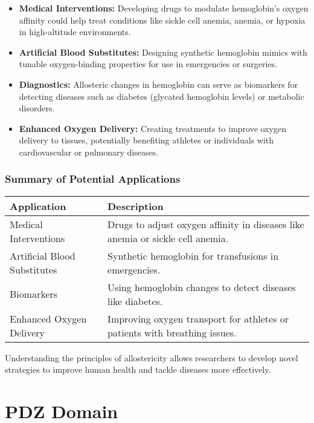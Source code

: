 \documentclass[English, Lau, oneside]{sapthesis}
\begin{document}
\begin{itemize}
    \item \textbf{Medical Interventions:} Developing drugs to modulate hemoglobin’s oxygen affinity could help treat conditions like sickle cell anemia, anemia, or hypoxia in high-altitude environments.
    \item \textbf{Artificial Blood Substitutes:} Designing synthetic hemoglobin mimics with tunable oxygen-binding properties for use in emergencies or surgeries.
    \item \textbf{Diagnostics:} Allosteric changes in hemoglobin can serve as biomarkers for detecting diseases such as diabetes (glycated hemoglobin levels) or metabolic disorders.
    \item \textbf{Enhanced Oxygen Delivery:} Creating treatments to improve oxygen delivery to tissues, potentially benefiting athletes or individuals with cardiovascular or pulmonary diseases.
\end{itemize}

\subsection{Summary of Potential Applications}
\begin{center}
    \begin{tabular}{|l|p{10cm}|}
        \hline
        \textbf{Application} & \textbf{Description} \\ \hline
        Medical Interventions & Drugs to adjust oxygen affinity in diseases like anemia or sickle cell anemia. \\ \hline
        Artificial Blood Substitutes & Synthetic hemoglobin for transfusions in emergencies. \\ \hline
        Biomarkers & Using hemoglobin changes to detect diseases like diabetes. \\ \hline
        Enhanced Oxygen Delivery & Improving oxygen transport for athletes or patients with breathing issues. \\ \hline
    \end{tabular}
\end{center}

Understanding the principles of allostericity allows researchers to develop novel strategies to improve human health and tackle diseases more effectively.
\chapter{PDZ Domain}
\end{document}
